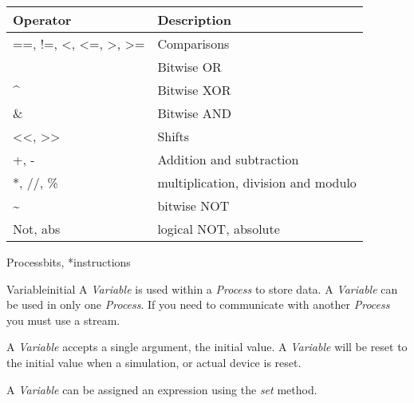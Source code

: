 \documentclass[letterpaper,10pt,english]{manual}
\begin{document}
\begin{tabulary}{\textwidth}{|L|L|}
\hline
\textbf{
Operator
} & \textbf{
Description
}\\
\hline

==, !=, \textless{}, \textless{}=, \textgreater{}, \textgreater{}=
 & 
Comparisons
\\
{\raggedright{}~}
 & 
Bitwise OR
\\

\textasciicircum{}
 & 
Bitwise XOR
\\

\&
 & 
Bitwise AND
\\

\textless{}\textless{}, \textgreater{}\textgreater{}
 & 
Shifts
\\

+, -
 & 
Addition and subtraction
\\

*, //, \%
 & 
multiplication, division and modulo
\\

\textasciitilde{}
 & 
bitwise NOT
\\

Not, abs
 & 
logical NOT, absolute
\\
\hline
\end{tabulary}


\hypertarget{chips.Process}{}\begin{classdesc}{Process}{bits, *instructions}\end{classdesc}

\hypertarget{chips.Variable}{}\begin{classdesc}{Variable}{initial}
A \emph{Variable} is used within a \emph{Process} to store data. A \emph{Variable} can
be used in only one \emph{Process}. If you need to communicate with another
\emph{Process} you must use a stream.

A \emph{Variable} accepts a single argument, the initial value. A \emph{Variable}
will be reset to the initial value when a simulation, or actual device is
reset.

A \emph{Variable} can be assigned an expression using the \emph{set} method.
\end{classdesc}
\end{document}
